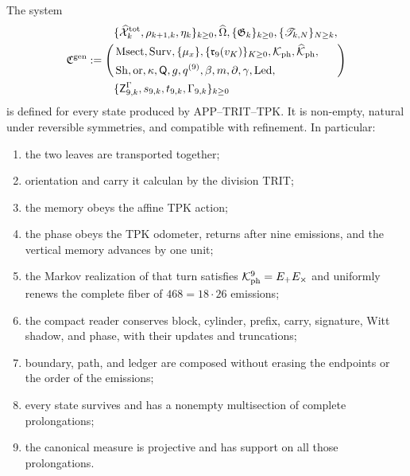 \begin{theorem}
\label{thm:continuo-comun-propietario}
The system
\begin{equation}
\label{eq:continuo-comun-propietario}
 \mathfrak C^{\rm gen}:=\Biggl(
 \begin{aligned}
 &\{\widehat{\mathcal X}^{\rm tot}_k,\rho_{k+1,k},\eta_k\}_{k\geq0},
   \widehat\Omega,\{\mathfrak G_k\}_{k\geq0},
   \{\mathscr T_{k,N}\}_{N\geq k},\\
 &\operatorname{Msect},\operatorname{Surv},\{\mu_x\},
   \{\mathfrak r_9(v_K)\}_{K\geq0},
   \mathcal K_{\rm ph},\widehat{\mathcal K}_{\rm ph},\\
 &\operatorname{Sh},\operatorname{or},\kappa,
   \mathsf Q,g,q^{(9)},\beta,m,\partial,\gamma,\operatorname{Led},\\
 &\{\mathsf Z^\Gamma_{9,k},s_{9,k},t_{9,k},\Gamma_{9,k}\}_{k\geq0}
 \end{aligned}
 \Biggr)
\end{equation}
is defined for every state produced by APP--TRIT--TPK\@.  It is non-empty,
natural under reversible symmetries, and compatible with refinement.  In
particular:
\begin{enumerate}
 \item the two leaves are transported together;
 \item orientation and carry it calculan by the division TRIT;
 \item the memory obeys the affine TPK action;
 \item the phase obeys the TPK odometer, returns after nine emissions, and the
       vertical memory advances by one unit;
 \item the Markov realization of that turn satisfies
       \(\mathcal K_{\rm ph}^9=E_+E_\times\) and uniformly renews the complete fiber of \(468=18\cdot26\) emissions;
 \item the compact reader conserves block, cylinder, prefix, carry, signature,
       Witt shadow, and phase, with their updates and truncations;
 \item boundary, path, and ledger are composed without erasing the endpoints or the
       order of the emissions;
 \item every state survives and has a nonempty multisection of complete prolongations;
 \item the canonical measure is projective and has support on all those
       prolongations.
\end{enumerate}
\end{theorem}

